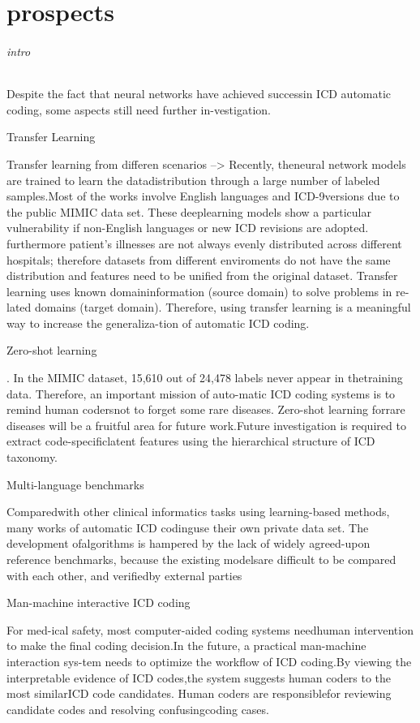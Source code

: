 \part{prospects}
\paragraph{intro}
Despite the fact that neural networks have achieved successin ICD automatic coding, some aspects still need further in-vestigation.

\subparagraph{Transfer Learning}
Transfer learning from differen scenarios --> Recently,  theneural  network  models  are  trained  to  learn  the  datadistribution through a large number of labeled samples.Most of the works involve English languages and ICD-9versions due to the public MIMIC data set. These deeplearning models show a particular vulnerability if non-English  languages  or  new  ICD  revisions  are  adopted.
furthermore patient's illnesses are not always evenly distributed across different hospitals; therefore datasets from different enviroments do not have the same distribution and features need to be unified from the original dataset. 
Transfer learning uses known domaininformation  (source  domain)  to  solve  problems  in  re-lated domains (target domain). Therefore, using transfer learning is a meaningful way to increase the generaliza-tion of automatic ICD coding.

\subparagraph{Zero-shot learning}
. In the MIMIC dataset,  15,610  out  of  24,478  labels  never  appear  in  thetraining data. Therefore, an important mission of auto-matic  ICD  coding  systems  is  to  remind  human  codersnot to forget some rare diseases. Zero-shot learning forrare  diseases  will  be  a  fruitful  area  for  future  work.Future investigation is required to extract code-specificlatent  features  using  the  hierarchical  structure  of  ICD taxonomy.

\subparagraph{Multi-language benchmarks}
Comparedwith  other  clinical  informatics  tasks  using  learning-based  methods,  many  works  of  automatic  ICD  codinguse  their  own  private  data  set.  The  development  ofalgorithms  is  hampered  by  the  lack  of  widely  agreed-upon reference benchmarks, because the existing modelsare difficult to be compared with each other, and verifiedby external parties

\subparagraph{Man-machine interactive ICD coding}
 For med-ical  safety,  most  computer-aided  coding  systems  needhuman  intervention  to  make  the  final  coding  decision.In  the  future,  a  practical  man-machine  interaction  sys-tem  needs  to  optimize  the  workflow  of  ICD  coding.By  viewing  the  interpretable  evidence  of  ICD  codes,the  system  suggests  human  coders  to  the  most  similarICD  code  candidates.  Human  coders  are  responsiblefor reviewing candidate codes and resolving confusingcoding cases.

